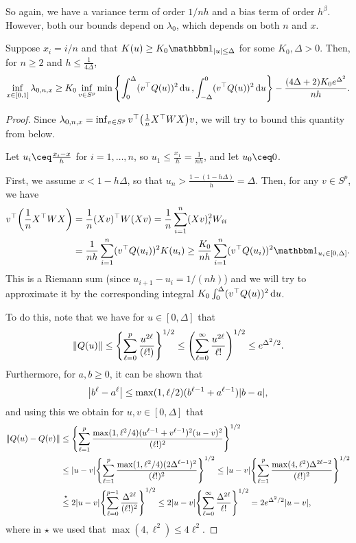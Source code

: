 So again, we have a variance term of order $1/nh$ and a bias term of order $h^\beta$. However, both our bounds depend on $\lambda_0$, which depends on both $n$ and $x$. 
\begin{proposition}
Suppose $x_i = i/n$ and that $K(u) \geq K_0 \ind_{\abs{u} \leq \Delta}$ for some $K_0, \Delta > 0$. Then, for $n \geq 2$ and $h \leq \frac1{4\Delta}$, 
\[
\inf_{x \in [0, 1]} \lambda_{0, n, x} \geq K_0 \inf_{v \in S^p} \min \qty{\int_0^\Delta (v^\top Q(u))^2 \dd{u}, \int_{-\Delta}^0 (v^\top Q(u))^2 \dd{u}} - \frac{(4\Delta + 2) K_0 e^{\Delta^2}}{nh}. 
\]
\end{proposition}

\begin{proof}
Since $\lambda_{0, n, x} = \inf_{v \in S^p} v^\top \qty(\frac1n X^\top W X)v$, we will try to bound this quantity from below. 
	
Let $u_i \ceq \frac{x_i - x}{h}$ for $i = 1, \dotsc, n$, so $u_1 \leq \frac{x_1}{h} = \frac{1}{nh}$, and let $u_0 \ceq 0$. 

First, we assume $x < 1 - h\Delta$, so that $u_n > \frac{1 - (1 - h\Delta)}{h} = \Delta$. Then, for any $v \in S^p$, we have
\begin{align*}
v\T \qty(\frac1n X\T W X) &= \frac1n (Xv)\T W (Xv) = \frac1n \sum_{i=1}^n (Xv)_i^2  W_{ii}\\
& = \frac1{nh} \sum_{i=1}^n (v\T Q(u_i))^2 K(u_i) \geq \frac{K_0}{nh} \sum_{i=1}^n (v\T Q(u_i))^2 \ind_{u_i \in [0, \Delta]} .
\end{align*}
This is a Riemann sum (since $u_{i+1} - u_i = 1/(nh)$) and we will try to approximate it by the corresponding integral $K_0 \int_0^\Delta (v^\top Q(u))^2 \dd{u}$. 

To do this, note that we have for $u \in [0, \Delta]$ that
\[
\norm{Q(u)}  \leq \qty{\sum_{\ell = 0}^p \frac{u^{2\ell}}{(\ell!)}}^{1/2} \leq \qty(\sum_{\ell = 0}^\infty \frac{u^{2\ell}}{\ell!})^{1/2} \leq e^{\Delta^2/2}. 
\] 
Furthermore, for $a, b \geq 0$, it can be shown that
\[
\abs{b^\ell - a^\ell} \leq \max(1, \ell / 2) (b^{\ell - 1} + a^{\ell - 1})\abs{b - a},
\]
and using this we obtain for $u, v \in [0, \Delta]$ that 
\begin{align*}
	\norm{Q(u)- Q(v)} &\leq \qty{\sum_{\ell =1 }^p \frac{\max(1, \ell^2/4) (u^{\ell - 1} + v^{\ell - 1})^2 (u - v)^2}{(\ell !)^2}}^{1/2} \\
	&\leq \abs{u - v} \qty{\sum_{\ell = 1}^p \frac{\max(1, \ell^2/4)(2\Delta^{\ell - 1})^2}{(\ell!)^2}}^{1/2} \leq \abs{u - v} \qty{\sum_{\ell = 1}^p \frac{\max(4, \ell^2) \Delta^{2\ell - 2}}{(\ell!)^2}}^{1/2} 
	 \\
	 &\overset\star\leq  2\abs{u - v} \qty{\sum_{\ell = 0}^{p - 1} \frac{\Delta^{2\ell}}{(\ell!)^2}}^{1/2} \leq 	2 \abs{u - v} \qty{\sum_{\ell = 0}^\infty \frac{\Delta^{2\ell}}{\ell!}}^{1/2} = 2 e^{\Delta^2/2}\abs{u-v}, 
\end{align*}
where in $\star$ we used that $\max(4, \ell^2) \leq 4\ell^2$.


\end{proof}
